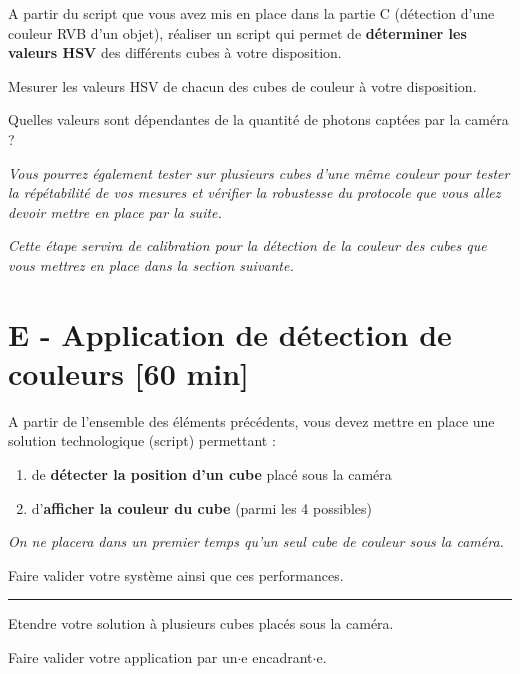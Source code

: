 \documentclass[a4paper,12pt,titlepage]{article} %
\begin{document}
\Manip A partir du script que vous avez mis en place dans la partie C (détection d'une couleur RVB d'un objet), réaliser un script qui permet de \textbf{déterminer les valeurs HSV} des différents cubes à votre disposition.

\Manip Mesurer les valeurs HSV de chacun des cubes de couleur à votre disposition.

\Quest Quelles valeurs sont dépendantes de la quantité de photons captées par la caméra ?

\medskip

\textit{Vous pourrez également tester sur plusieurs cubes d'une même couleur pour tester la répétabilité de vos mesures et vérifier la robustesse du protocole que vous allez devoir mettre en place par la suite.}

\medskip

\textit{Cette étape servira de calibration pour la détection de la couleur des cubes que vous mettrez en place dans la section suivante.}

\newpage
\section{E - Application de détection de couleurs {[60 min]}}


\Manip A partir de l'ensemble des éléments précédents, vous devez mettre en place une solution technologique (script) permettant :

	\begin{enumerate}
		\item de \textbf{détecter la position d'un cube} placé sous la caméra
		\item d'\textbf{afficher la couleur du cube} (parmi les 4 possibles)
	\end{enumerate}

\textit{On ne placera dans un premier temps qu'un seul cube de couleur sous la caméra.}

\medskip	
	
\Quest Faire valider votre système ainsi que ces performances.


\noindent \rule{\linewidth}{1pt}

\Manip Etendre votre solution à plusieurs cubes placés sous la caméra.

\bigskip

\begin{mdframed}[style=sidebar,frametitle={}]
\large
Faire valider votre application par un$\cdot$e encadrant$\cdot$e.
\end{mdframed}
\end{document}
